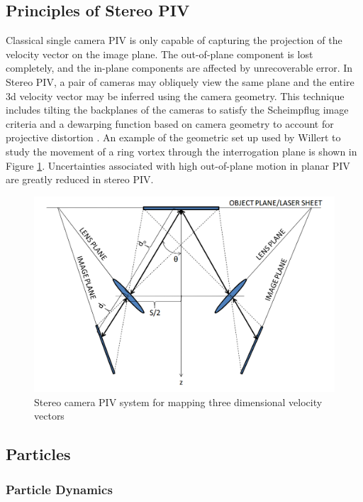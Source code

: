\subsection{Principles of Stereo PIV}

Classical single camera PIV is only capable of capturing the projection of the 
velocity vector on the image plane. The out-of-plane component is lost 
completely, and the in-plane components are affected by unrecoverable error. In 
Stereo PIV, a pair of cameras may obliquely view the same plane and the entire 
3d velocity vector may be inferred using the camera geometry. This technique 
includes tilting the backplanes of the cameras to satisfy the Scheimpflug image 
criteria and a dewarping function based on camera geometry to account for 
projective distortion \cite{willert1997}. An example of the geometric set up 
used by Willert to study the movement of a ring vortex through the 
interrogation plane is shown in Figure \ref{fig:stereo_piv}. Uncertainties 
associated with high out-of-plane motion in planar PIV are greatly reduced in 
stereo PIV.

\begin{figure}[H]
	\centering
	\includegraphics[width=5in]{figs/piv_method/stereo_piv_optics}
	\caption{Stereo camera PIV system for mapping three dimensional velocity 
		vectors}
	\label{fig:stereo_piv}
\end{figure}  

\subsection{Particles}

\subsubsection{Particle Dynamics} 

